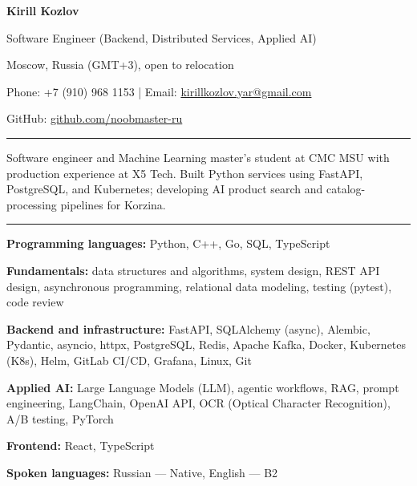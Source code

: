 \documentclass[10pt,a4paper]{article}
\newcommand{\cvsection}[1]{%
  \vspace{5pt}{\large\bfseries #1}\par\vspace{2pt}\hrule\vspace{3pt}}
\begin{document}
{\LARGE\bfseries Kirill Kozlov}\par\vspace{3pt}
Software Engineer (Backend, Distributed Services, Applied AI)\par\vspace{3pt}
Moscow, Russia (GMT+3), open to relocation\par
Phone: +7 (910) 968 1153 | Email: \href{mailto:kirillkozlov.yar@gmail.com}{kirillkozlov.yar@gmail.com}\par
GitHub: \href{https://github.com/noobmaster-ru}{github.com/noobmaster-ru}

\cvsection{Summary}
Software engineer and Machine Learning master's student at CMC MSU with production experience at X5 Tech. Built Python services using FastAPI, PostgreSQL, and Kubernetes; developing AI product search and catalog-processing pipelines for Korzina.

\cvsection{Technical Skills}
\textbf{Programming languages:} Python, C++, Go, SQL, TypeScript\par
\textbf{Fundamentals:} data structures and algorithms, system design, REST API design, asynchronous programming,
relational data modeling, testing (pytest), code review\par
\textbf{Backend and infrastructure:} FastAPI, SQLAlchemy (async), Alembic, Pydantic, asyncio, httpx, PostgreSQL, Redis,
Apache Kafka, Docker, Kubernetes (K8s), Helm, GitLab CI/CD, Grafana, Linux, Git\par
\textbf{Applied AI:} Large Language Models (LLM), agentic workflows, RAG, prompt engineering, LangChain, OpenAI API,
OCR (Optical Character Recognition), A/B testing, PyTorch\par
\textbf{Frontend:} React, TypeScript\par
\textbf{Spoken languages:} Russian --- Native, English --- B2
\end{document}
